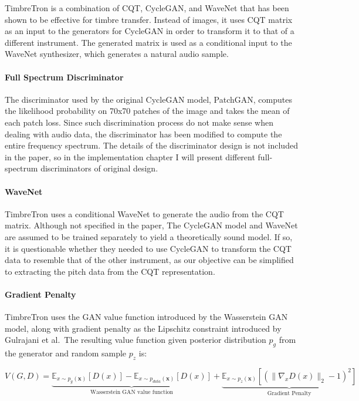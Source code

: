 \documentclass[12pt,a4paper,]{report}
\begin{document}
TimbreTron is a combination of CQT, CycleGAN, and WaveNet that has been
shown to be effective for timbre transfer. Instead of images, it uses
CQT matrix as an input to the generators for CycleGAN in order to
transform it to that of a different instrument. The generated matrix is
used as a conditional input to the WaveNet synthesizer, which generates
a natural audio sample.

\paragraph{Full Spectrum Discriminator}

The discriminator used by the original CycleGAN model, PatchGAN,
computes the likelihood probability on 70x70 patches of the image and
takes the mean of each patch loss. Since such discrimination process do
not make sense when dealing with audio data, the discriminator has been
modified to compute the entire frequency spectrum. The details of the
discriminator design is not included in the paper, so in the
implementation chapter I will present different full-spectrum
discriminators of original design.

\paragraph{WaveNet}

TimbreTron uses a conditional WaveNet to generate the audio from the CQT
matrix. Although not specified in the paper, The CycleGAN model and
WaveNet are assumed to be trained separately to yield a theoretically
sound model. If so, it is questionable whether they needed to use
CycleGAN to transform the CQT data to resemble that of the other
instrument, as our objective can be simplified to extracting the pitch
data from the CQT representation.

\paragraph{Gradient Penalty}

TimbreTron uses the GAN value function introduced by the Wasserstein GAN
model, along with gradient penalty as the Lipschitz constraint
introduced by Gulrajani et al.~The resulting value function given
posterior distribution \(p_g\) from the generator and random sample
\(p_z\) is:

\begin{equation}
    V(G, D) = \underbrace{
        \mathbb{E}_{x \sim p_{g}(\mathbf{x})} [D(x)] - \mathbb{E}_{x \sim p_{data}(\mathbf{x})} [D(x)]
        }_\textrm{Wasserstein GAN value function} +
        \underbrace{
            \mathbb{E}_{x \sim p_z(\mathbf{x})} [(\| \nabla_x D(x) \|_2 - 1)^2]
        }_\textrm{Gradient Penalty} 
\end{equation}
\end{document}
